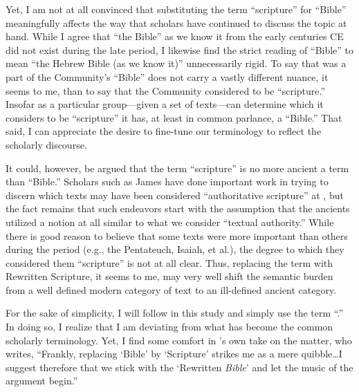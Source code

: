 Yet, I am not at all convinced that substituting the term ``scripture'' for ``Bible'' meaningfully affects the way that scholars have continued to discuss the topic at hand. While I agree that ``the Bible'' as we know it from the early centuries CE did not exist during the late \secondtemple period, I likewise find the strict reading of ``Bible'' to mean ``the Hebrew Bible (as we know it)'' unnecessarily rigid. To say that \jub was a part of the \qumran Community's ``Bible'' does not carry a vastly different nuance, it seems to me, than to say that the \qumran Community considered \jub to be ``scripture.'' Insofar as a particular group---given a set of texts---can determine which it considers to be ``scripture'' it has, at least in common parlance, a ``Bible.'' That said, I can appreciate the desire to fine-tune our terminology to reflect the scholarly discourse. 

It could, however, be argued that the term ``scripture'' is no more ancient a term than ``Bible.'' Scholars such as James \vanderkam have done important work in trying to discern which texts may have been considered ``authoritative scripture'' at \qumran,%
    \autocite{vanderkam_dsd1998}
but the fact remains that such endeavors start with the assumption that the ancients utilized a notion at all similar to what we consider ``textual authority.'' While there is good reason to believe that some texts were more important than others during the \secondtemple period (e.g., the Pentateuch, Isaiah, et al.), the degree to which they considered them ``scripture'' is not at all clear.  Thus, replacing the term \rwb with Rewritten Scripture, it seems to me, may very well shift the semantic burden from a well defined modern category of text to an ill-defined ancient category. 

For the sake of simplicity, I will follow \vermes in this study and simply use the term ``\RwB.'' In doing so, I realize that I am deviating from what has become the common scholarly terminology. Yet, I find some comfort in \vermes's own take on the matter, who writes, ``Frankly, replacing `Bible' by `Scripture' strikes me as a mere quibble\ldots{}I suggest therefore that we stick with the `Rewritten \emph{Bible}' and let the music of the argument begin.''%
    \autocite[original emphasis]{vermes_zsengeller2014} 